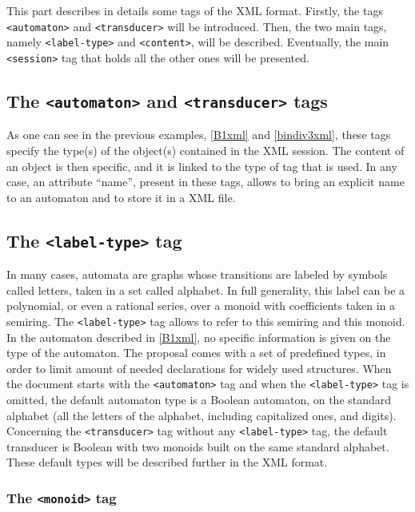 \documentclass[a4paper]{article}
\def\typetag{\texttt{<label-type>}}
\def\contenttag{\texttt{<content>}}
\def\sessiontag{\texttt{<session>}}
\def\automatontag{\texttt{<automaton>}}
\def\transducertag{\texttt{<transducer>}}
\def\monoidtag{\texttt{<monoid>}}
\begin{document}
This part describes in details some tags of the XML format.
Firstly, the tags \automatontag{} and \transducertag{} will be introduced.
Then, the two main tags, namely \typetag{} and \contenttag{}, will be described.
Eventually, the main \sessiontag{} tag that holds all the other ones will be
presented.

\subsection{The \automatontag{} and \transducertag{} tags}

As one can see in the previous examples, \autoref{B1xml} and
\autoref{bindiv3xml}, these tags specify the type(s) of the object(s)
contained in the XML session. The content of an object is then
specific, and it is linked to the type of tag that is used.  In any
case, an attribute ``name'', present in these tags, allows to bring an
explicit name to an automaton and to store it in a XML file.

\subsection{The \typetag{} tag}

In many cases, automata are graphs whose transitions are labeled by
symbols called letters, taken in a set called alphabet. In full
generality, this label can be a polynomial, or even a rational series,
over a monoid with coefficients taken in a semiring. The \typetag{}
tag allows to refer to this semiring and this monoid.\\

In the automaton described in \autoref{B1xml}, no specific
information is given on the type of the automaton. The proposal comes
with a set of predefined types, in order to limit amount of needed
declarations for widely used structures. When the document starts with
the \automatontag{} tag and when the \typetag{} tag is omitted,
the default automaton type is a Boolean automaton, on the standard
alphabet (all the letters of the alphabet, including capitalized ones, and digits).
Concerning the \transducertag{} tag without any \typetag{} tag, the default
transducer is Boolean with two monoids built on the same standard alphabet.
These default types will be described further in the XML format.


\subsubsection{The \monoidtag{} tag}
\end{document}
